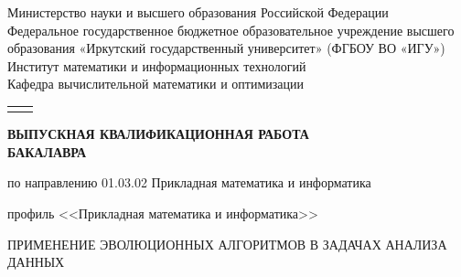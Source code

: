 \documentclass[732]{studrep}
\theoremstyle{nonumberplain}
\begin{document}
\thispagestyle{empty}
\begin{center}
Министерство науки и высшего образования Российской Федерации\\
Федеральное государственное бюджетное образовательное учреждение высшего образования
«Иркутский государственный университет»
(ФГБОУ ВО «ИГУ»)\\%
Институт математики и информационных технологий\\%
Кафедра вычислительной математики и оптимизации\\%
\end{center}
\vspace{-1em}
\noindent\begin{tabularx}{\textwidth} {
  >{\raggedright\arraybackslash}X
  >{\raggedright}X }
&




\end{tabularx}
\vspace{2em}
\begin{center}
  \textbf{ ВЫПУСКНАЯ КВАЛИФИКАЦИОННАЯ РАБОТА\\
БАКАЛАВРА}
\vspace{1em}

по направлению 01.03.02 Прикладная математика и информатика

профиль <<Прикладная математика и информатика>>

\vspace{2em}
 ПРИМЕНЕНИЕ ЭВОЛЮЦИОННЫХ АЛГОРИТМОВ В ЗАДАЧАХ АНАЛИЗА ДАННЫХ

\vspace{1em}

\end{center}
\vfill
\end{document}

